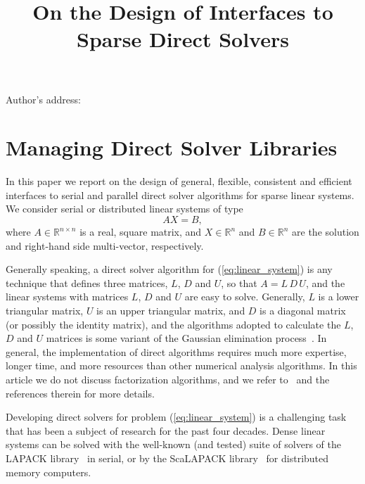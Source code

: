 \documentclass[acmtocl]{acmtrans2m}
\title{On the Design of Interfaces to Sparse Direct Solvers}
\author{}
\begin{document}
\setcounter{page}{1}

\begin{bottomstuff}
Author's address: 
\end{bottomstuff}

\maketitle

\section{Managing Direct Solver Libraries}
\label{sec:introduction}

In this paper we report on the design of general, flexible, consistent and
efficient interfaces to serial and parallel direct solver algorithms for
sparse linear systems. We consider serial or distributed linear systems of
type
\begin{equation}
  \label{eq:linear_system}
  A X = B,
\end{equation}
where $A \in \mathbb{R}^{n \times n}$ is a real, square matrix, 
  and $X \in \mathbb{R}^{n}$ and $B \in \mathbb{R}^{n}$  are the solution and
right-hand side multi-vector, respectively. 

Generally speaking,
a direct solver algorithm for (\ref{eq:linear_system}) is any 
technique that defines three matrices, $L$, $D$ and $U$, so that
$A = L \, D \, U$, and the linear systems with matrices $L$, $D$ and $U$ are
easy to solve. Generally, $L$ is a lower triangular matrix, $U$ is an
upper triangular matrix, and $D$ is a diagonal matrix 
(or possibly the identity matrix), and the algorithms adopted to calculate the
$L$, $D$ and $U$ matrices is some variant of the Gaussian elimination
process~\cite{xxx}. In general, the implementation of direct algorithms
requires much more expertise, longer time, and more resources than other
numerical analysis algorithms.  In this article we do not discuss
factorization algorithms, and we refer
to~\cite{amestoy01analysis,gupta01recent} and the references therein for more
details.  

Developing direct solvers for problem (\ref{eq:linear_system}) is a
challenging task that has been a subject of research for the
past four decades. Dense linear systems can be solved with the
well-known (and tested) suite of solvers of the LAPACK
library~\cite{lapack-guide} in serial, or by the ScaLAPACK
library~\cite{scalapack-guide} for distributed memory computers.
\end{document}
